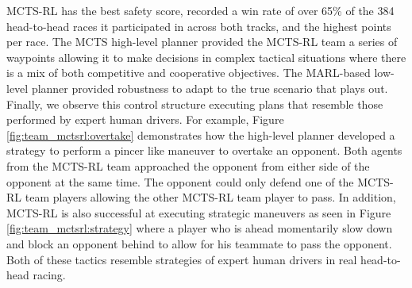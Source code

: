 \begin{enumerate}[wide, labelindent=0pt, font=\bfseries]
 MCTS-RL has the best safety score, recorded a win rate of over 65\% of the 384 head-to-head races it participated in across both tracks, and the highest points per race. The MCTS high-level planner provided the MCTS-RL team a series of waypoints allowing it to make decisions in complex tactical situations where there is a mix of both competitive and cooperative objectives. The MARL-based low-level planner provided robustness to adapt to the true scenario that plays out. Finally, we observe this control structure executing plans that resemble those performed by expert human drivers. 
 For example, Figure~ \ref{fig:team_mctsrl:overtake} demonstrates how the high-level planner developed a strategy to perform a pincer like maneuver to overtake an opponent. Both agents from the MCTS-RL team approached the opponent from either side of the opponent at the same time. The opponent could only defend one of the MCTS-RL team players allowing the other MCTS-RL team player to pass. In addition, MCTS-RL is also successful at executing strategic maneuvers as seen in Figure~ \ref{fig:team_mctsrl:strategy} where a player who is ahead momentarily slow down and block an opponent behind to allow for his teammate to pass the opponent. Both of these tactics resemble strategies of expert human drivers in real head-to-head racing.
 \end{enumerate}
 
